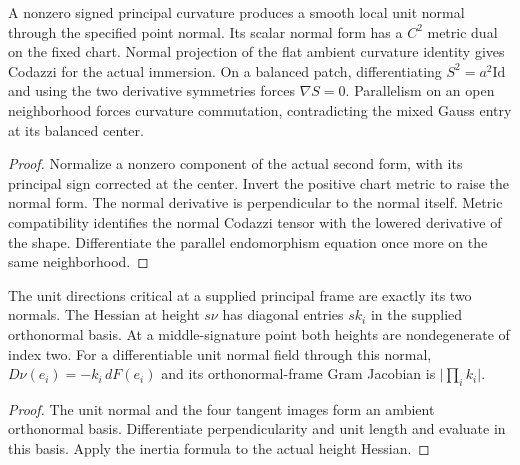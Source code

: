 \begin{lemma}
\label{lem:ed03-normal-codazzi}
\leanok
A nonzero signed principal curvature produces a smooth local unit normal
through the specified point normal. Its scalar normal form has a
\(C^2\) metric dual on the fixed chart. Normal projection of the flat
ambient curvature identity gives Codazzi for the actual immersion.
On a balanced patch, differentiating \(S^2=a^2\mathrm{Id}\) and using
the two derivative symmetries forces \(\nabla S=0\). Parallelism on an
open neighborhood forces curvature commutation, contradicting the mixed
Gauss entry at its balanced center.
\end{lemma}
\begin{proof}
\leanok
Normalize a nonzero component of the actual second form, with its
principal sign corrected at the center. Invert the positive chart
metric to raise the normal form. The normal derivative is perpendicular
to the normal itself. Metric compatibility identifies the normal
Codazzi tensor with the lowered derivative of the shape. Differentiate
the parallel endomorphism equation once more on the same neighborhood.
\end{proof}

\begin{lemma}
\label{lem:ed03-normal-heights}
\leanok
The unit directions critical at a supplied principal frame are exactly
its two normals. The Hessian at height \(s\nu\) has diagonal entries
\(s k_i\) in the supplied orthonormal basis. At a middle-signature
point both heights are nondegenerate of index two. For a differentiable
unit normal field through this normal, \(D\nu(e_i)=-k_i\,dF(e_i)\)
and its orthonormal-frame Gram Jacobian is \(\lvert\prod_i k_i\rvert\).
\end{lemma}
\begin{proof}
\leanok
The unit normal and the four tangent images form an ambient orthonormal
basis. Differentiate perpendicularity and unit length and evaluate in
this basis. Apply the inertia formula to the actual height Hessian.
\end{proof}

